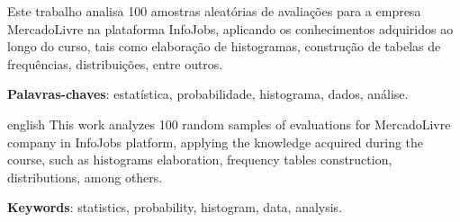 	
	\imprimircapa
	\imprimirfolhaderosto
	\begin{resumo}		
	   Este trabalho analisa 100 amostras aleatórias de avaliações para a empresa MercadoLivre na plataforma InfoJobs, aplicando os conhecimentos adquiridos ao longo do curso, tais como elaboração de histogramas, construção de tabelas de frequências, distribuições, entre outros.
	
	   \vspace{\onelineskip}
	   \noindent
	   \textbf{Palavras-chaves}: estatística, probabilidade, histograma, dados, análise.
	\end{resumo}
	
	
	\begin{resumo}[Abstract]
	   \begin{otherlanguage*}{english}
	      This work analyzes 100 random samples of evaluations for MercadoLivre company in InfoJobs platform, applying the knowledge acquired during the course, such as histograms elaboration, frequency tables construction, distributions, among others.
	
	      \vspace{\onelineskip}
	      \noindent
	      \textbf{Keywords}: statistics, probability, histogram, data, analysis.
	   \end{otherlanguage*}
	\end{resumo}
	
